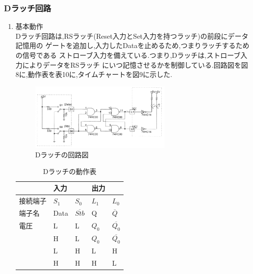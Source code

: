 \documentclass[twocolumn, 10pt,a4j]{jsarticle}
\begin{document}
  \subsubsection{Dラッチ回路}
    \begin{enumerate}
      \item 基本動作 \\
      Dラッチ回路は,RSラッチ(Reset入力とSet入力を持つラッチ)の前段にデータ記憶用の
      ゲートを追加し,入力したDataを止めるため,つまりラッチするための信号である
      ストローブ入力を備えている.つまり,Dラッチは,ストローブ入力によりデータをRSラッチ
      にいつ記憶させるかを制御している.回路図を図8に,動作表を表10に,タイムチャートを図9に示した.
      \begin{figure}[H]
        \begin{center}
          \includegraphics[width=7cm]{../img/junjokairo/d_ratch.png}
          \caption{Dラッチの回路図}
        \end{center}
      \end{figure}
      \begin{table}[H]
        \centering
        \caption{Dラッチの動作表}
        \label{my-label}
          \begin{tabular}{l|ll|ll}
              & 入力      &                                 & 出力                           &                                      \\ \hline
          接続端子 & $S_{1}$ & $S_{0}$                         & $L_{1}$ & $L_{0}$                              \\ \hline
          端子名  & Data    & $\overline{Stb}$              & Q       & $\overline{Q}$        \\ \hline
          電圧   & L       & L                               & $Q_{0}$ & $\overline{Q_{0}}$ \\
              & H       & L                               & $Q_{0}$ & $\overline{Q_{0}}$ \\
              & L       & H                               & L       & H                                    \\
              & H       & H                               & H       & L                                   

\end{tabular}
\end{table}
\end{enumerate}
\end{document}
